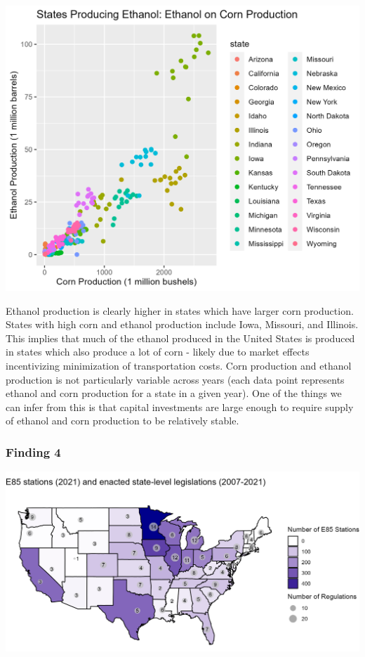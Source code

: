 \documentclass[
]{article}
\begin{document}
\includegraphics[width=6.25in,height=\textheight]{images/EthCornScatterByState.png}

Ethanol production is clearly higher in states which have larger corn
production. States with high corn and ethanol production include Iowa,
Missouri, and Illinois. This implies that much of the ethanol produced
in the United States is produced in states which also produce a lot of
corn - likely due to market effects incentivizing minimization of
transportation costs. Corn production and ethanol production is not
particularly variable across years (each data point represents ethanol
and corn production for a state in a given year). One of the things we
can infer from this is that capital investments are large enough to
require supply of ethanol and corn production to be relatively stable.

\hypertarget{finding-4}{%
\subsubsection{Finding 4}\label{finding-4}}

\includegraphics[width=6.25in,height=\textheight]{images/e85_legislations_map-04.png}
\end{document}
